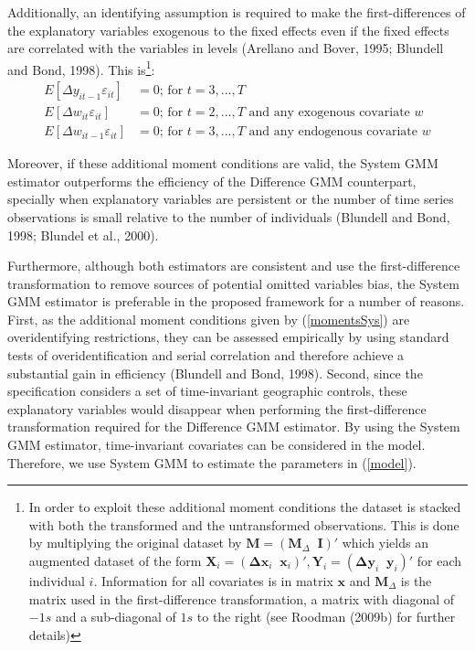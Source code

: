 \documentclass[12pt,a4paper,english]{article}%
\begin{document}
Additionally, an identifying assumption is required to make the first-differences of the explanatory variables exogenous to the fixed effects even if the fixed effects are correlated with the variables in levels (Arellano and Bover, 1995; Blundell and Bond, 1998). This is\footnote{In order to exploit these additional moment conditions the dataset is stacked with both the transformed and the untransformed observations. This is done by multiplying the original dataset by $\mathbf{M}=\left(\mathbf{M}_{\Delta}\;\;\mathbf{I}\right)'$ which yields an augmented dataset of the form $\mathbf{X}_{i}=\left(\mathbf{\Delta x}_{i}\;\;\mathbf{x}_i\right)', \mathbf{Y}_{i}=\left(\mathbf{\Delta y}_{i}\;\;\mathbf{y}_i\right)'$ for each individual $i$. Information for all covariates is in matrix $\mathbf{x}$ and $\mathbf{M}_{\Delta}$ is the matrix used in the first-difference transformation, a matrix with diagonal of $-1s$ and a sub-diagonal of $1s$ to the right (see Roodman (2009b) for further details)}:
\begin{equation}
\label{momentsSys}
\begin{aligned}
E\left[\Delta y_{it-1}\varepsilon_{it}\right]&=0 \text{; for $t=3,...,T$}\\
E\left[\Delta w_{it}\varepsilon_{it}\right]&=0 \text{; for $t=2,...,T$ and any exogenous covariate $w$}\\
E\left[\Delta w_{it-1}\varepsilon_{it}\right]&=0 \text{; for $t=3,...,T$ and any endogenous covariate $w$}
\end{aligned}
\end{equation}

Moreover, if these additional moment conditions are valid, the System GMM estimator outperforms the efficiency of the Difference GMM counterpart, specially when explanatory variables are persistent or the number of time series observations is small relative to the number of individuals (Blundell and Bond, 1998; Blundel et al., 2000). 

Furthermore, although both estimators are consistent and use the first-difference transformation to remove sources of potential omitted variables bias, the System GMM estimator is preferable in the proposed framework for a number of reasons. First, as the additional moment conditions given by (\ref{momentsSys}) are overidentifying restrictions, they can be assessed empirically by using standard tests of overidentification and serial correlation and therefore achieve a substantial gain in efficiency (Blundell and Bond, 1998). Second, since the specification considers a set of time-invariant geographic controls, these explanatory variables would disappear when performing the first-difference transformation required for the Difference GMM estimator. By using the System GMM estimator, time-invariant covariates can be considered in the model. Therefore, we use System GMM to estimate the parameters in (\ref{model}).
\end{document}
